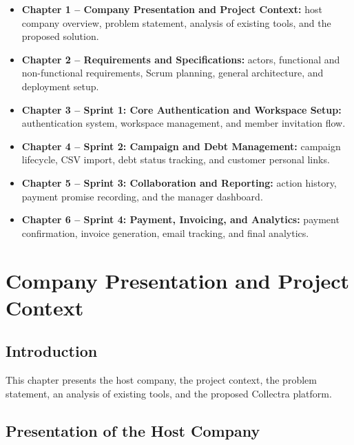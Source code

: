 \documentclass[12pt,a4paper]{report}
\begin{document}
\begin{itemize}
  \item \textbf{Chapter 1 -- Company Presentation and Project Context:}
        host company overview, problem statement, analysis of existing tools, and
        the proposed solution.
  \item \textbf{Chapter 2 -- Requirements and Specifications:}
        actors, functional and non-functional requirements, Scrum planning, general
        architecture, and deployment setup.
  \item \textbf{Chapter 3 -- Sprint 1: Core Authentication and Workspace Setup:}
        authentication system, workspace management, and member invitation flow.
  \item \textbf{Chapter 4 -- Sprint 2: Campaign and Debt Management:}
        campaign lifecycle, CSV import, debt status tracking, and customer personal
        links.
  \item \textbf{Chapter 5 -- Sprint 3: Collaboration and Reporting:}
        action history, payment promise recording, and the manager dashboard.
  \item \textbf{Chapter 6 -- Sprint 4: Payment, Invoicing, and Analytics:}
        payment confirmation, invoice generation, email tracking, and final
        analytics.
\end{itemize}

\chapter{Company Presentation and Project Context}

\section*{Introduction}
{}

This chapter presents the host company, the project context, the problem statement,
an analysis of existing tools, and the proposed Collectra platform.

\section{Presentation of the Host Company}
\end{document}
